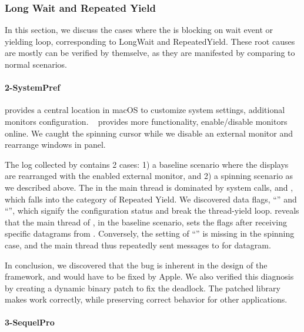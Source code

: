 \subsubsection{Long Wait and Repeated Yield}

In this section, we discuss the cases where the \spinningnode is blocking on
wait event or yielding loop, corresponding to LongWait and RepeatedYield.
These root causes are mostly can be verified by themselve, as they are
manifested by comparing to normal scenarios.

\paragraph{2-SystemPref}

 provides a central location in macOS to
customize system settings, \eg additional monitors configuration.
~\cite{disablemonitor} provides more functionality,
enable/disable monitors online. We caught the spinning cursor while we disable
an external monitor and rearrange windows in  panel.

The log collected by \xxx contains 2 cases: 1) a baseline scenario where
the displays are rearranged with the enabled external monitor, and 2) a
spinning scenario as we described above. The \spinningnode in the main
thread is dominated by system calls,  and ,
which falls into the category of Repeated Yield. We discovered data flags,
``'' and ``'', which
signify the configuration status and break the thread-yield loop. \xxx reveals
that the main thread of , in the baseline scenario, sets
the flags after receiving specific datagrams from . Conversely,
the setting of ``'' is missing in the spinning case,
and the main thread thus repeatedly sent messages to  for
datagram.

In conclusion, we discovered that the bug is inherent in the design of the
 framework, and would have to be fixed by Apple. We also
verified this diagnosis by creating a dynamic binary patch to fix the deadlock.
The patched library makes  work correctly, while preserving
correct behavior for other applications.

\paragraph{3-SequelPro}

